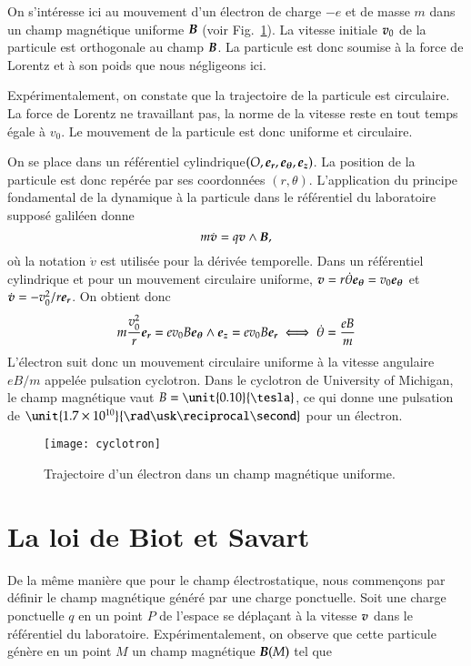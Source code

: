 \begin{exemple}
	On s'intéresse ici au mouvement d'un électron de charge $-e$ et de 
	masse $m$ dans un 
	champ magnétique uniforme $\vecb$ (voir Fig.~\ref{fig:magneto_cyclotron}). 
	La vitesse initiale $\vecv_0$ de la particule est orthogonale au champ
	$\vecb$. La particule est donc soumise à la force de Lorentz et à son
	poids que nous négligeons ici. 
	
	Expérimentalement, on constate que la trajectoire 
	de la particule est circulaire. La force de Lorentz ne travaillant pas, 
	la norme de la vitesse reste en tout temps égale à $v_0$. Le mouvement de la 
	particule est donc uniforme et circulaire.
	
	On se place dans
	un référentiel cylindrique$(O, \er, \etheta, \ez)$. La position de la particule
	est donc repérée par ses coordonnées $(r, \theta)$. L'application du principe
	fondamental de la dynamique à la particule dans le référentiel du
	laboratoire supposé galiléen donne
	\begin{equation*}
		m \dot{\vecv} = q \vecv \wedge \vecb,
	\end{equation*}
	où la notation $\dot{v}$ est utilisée pour la dérivée temporelle.
	Dans un référentiel cylindrique et pour un mouvement circulaire uniforme, 
	$\vecv = r\dot{\theta} \etheta = v_0 \etheta$ 
	et $\dot{\vecv} = - v_0^2/r\er$. On obtient donc
	\begin{equation*}
		m \dfrac{v_0^2}{r}\er = e v_0 B\etheta \wedge \ez =e v_0 B \er \iff 
		\dot{\theta} = \dfrac{eB}{m}
	\end{equation*}
	L'électron suit donc un mouvement circulaire uniforme à la vitesse angulaire
	$eB/m$ appelée pulsation cyclotron. Dans le cyclotron de University of Michigan,
	le champ magnétique vaut $B = \unit{0.10}{\tesla}$, ce qui donne une pulsation de 
	$\unit{1.7 \times 10^{10}}{\rad \usk \reciprocal \second}$ pour un électron.

\end{exemple}
\begin{figure}[h!]
	\centering
	\texttt{[image: cyclotron]}
	\caption{Trajectoire d'un électron dans un champ magnétique uniforme.}%
	\label{fig:magneto_cyclotron}
\end{figure}

\section{La loi de Biot et Savart}
De la même manière que pour le champ électrostatique, nous
commençons par définir le champ magnétique généré par une charge ponctuelle. 
Soit une charge ponctuelle $q$ en un point $P$ de l'espace se déplaçant 
à la vitesse $\vecv$ dans le référentiel du laboratoire. Expérimentalement,
on observe que cette particule génère
en un point $M$ un champ magnétique $\vecb(M)$ tel que

